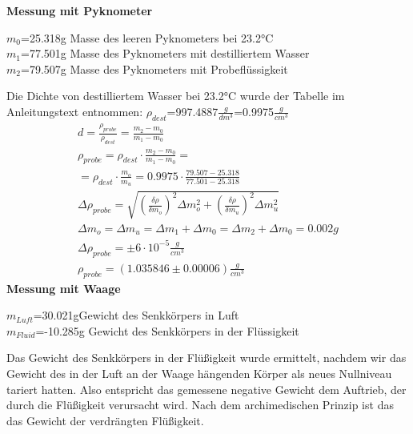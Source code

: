 \documentclass{article}
\begin{document}
\textbf{Messung mit Pyknometer}
\begin{center}
\begin{itemize}

$m_0$=25.318g \hspace{1cm} Masse des leeren Pyknometers bei 23.2°C \\
$m_1$=77.501g \hspace{1cm} Masse des Pyknometers mit destilliertem Wasser \\
$m_2$=79.507g \hspace{1cm} Masse des Pyknometers mit Probeflüssigkeit \\
\end{itemize}
\end{center}
Die Dichte von destilliertem Wasser bei 23.2°C wurde der Tabelle im Anleitungstext entnommen: $\rho_{dest}$=997.4887$\frac{g}{dm^3}$=0.9975$\frac{g}{cm^3}$
\begin{gather*}
d=\frac{\rho_{probe}}{\rho_{dest}}=\frac{m_2 - m_0}{m_1 - m_0}\\
\rho_{probe}=\rho_{dest}\cdot\frac{m_2 - m_0}{m_1 - m_0}= \\
= \rho_{dest}\cdot\frac{m_o}{m_u}= 0.9975\cdot\frac{79.507 - 25.318}{77.501 - 25.318} \\
\Delta \rho_{probe}=\sqrt{(\frac{\delta\rho}{\delta m_o})^2\Delta m_o^2+(\frac{\delta\rho}{\delta m_u})^2\Delta m_u^2} \\
\Delta m_o = \Delta m_u = \Delta m_1 + \Delta m_0 = \Delta m_2 + \Delta m_0 = 0.002g \\
\Delta \rho_{probe}=\pm6\cdot10^{-5}\frac{g}{cm^3} \\
\rho_{probe}=(1.035846  \pm 0.00006 )\frac{g}{cm^3}
\end{gather*}
\textbf{Messung mit Waage}
\begin{center}
\begin{itemize}

$m_{Luft}$=30.021g\hspace{1cm}Gewicht des Senkkörpers in Luft\\
$m_{Fluid}$=-10.285g \hspace{0.7cm}Gewicht des Senkkörpers in der Flüssigkeit\\
\end{itemize}
\end{center}
Das Gewicht des Senkkörpers in der Flüßigkeit wurde ermittelt, nachdem wir das Gewicht des in der Luft an der Waage hängenden Körper als neues Nullniveau tariert hatten. Also entspricht das gemessene negative Gewicht dem Auftrieb, der durch die Flüßigkeit verursacht wird. Nach dem archimedischen Prinzip ist das das Gewicht der verdrängten Flüßigkeit. \\ 
\end{document}
